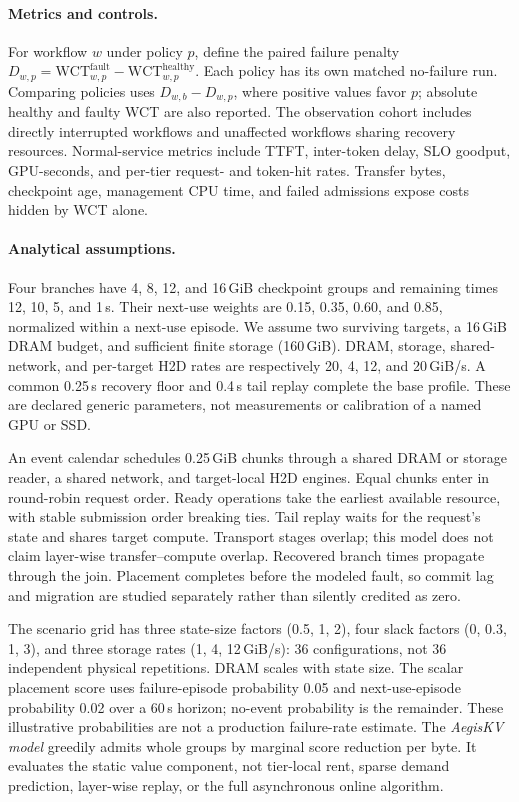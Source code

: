 \documentclass[sigplan,10pt,anonymous,nonacm]{acmart}
\begin{document}
\paragraph{Metrics and controls.}
For workflow $w$ under policy $p$, define the paired failure penalty
$D_{w,p}=\mathrm{WCT}^{\mathrm{fault}}_{w,p}-\mathrm{WCT}^{\mathrm{healthy}}_{w,p}$.
Each policy has its own matched no-failure run. Comparing policies uses
$D_{w,b}-D_{w,p}$, where positive values favor $p$; absolute healthy and
faulty WCT are also reported. The observation cohort includes directly
interrupted workflows and unaffected workflows sharing recovery resources.
Normal-service metrics include TTFT, inter-token delay, SLO goodput,
GPU-seconds, and per-tier request- and token-hit rates. Transfer bytes,
checkpoint age, management CPU time, and failed admissions expose costs
hidden by WCT alone.

\paragraph{Analytical assumptions.}
Four branches have 4, 8, 12, and 16\,GiB checkpoint groups and remaining
times 12, 10, 5, and 1\,s. Their next-use weights are 0.15, 0.35, 0.60,
and 0.85, normalized within a next-use episode. We assume two surviving
targets, a 16\,GiB DRAM budget, and sufficient finite storage (160\,GiB).
DRAM, storage, shared-network, and per-target H2D rates are respectively
20, 4, 12, and 20\,GiB/s. A common 0.25\,s recovery floor and 0.4\,s tail
replay complete the base profile. These are declared generic parameters,
not measurements or calibration of a named GPU or SSD.

An event calendar schedules 0.25\,GiB chunks through a shared DRAM or
storage reader, a shared network, and target-local H2D engines. Equal
chunks enter in round-robin request order. Ready operations take the
earliest available resource, with stable submission order breaking ties.
Tail replay waits for the request's state and shares target compute.
Transport stages overlap; this model does not claim layer-wise
transfer--compute overlap. Recovered branch times propagate through the
join. Placement completes before the modeled fault, so commit lag and
migration are studied separately rather than silently credited as zero.

The scenario grid has three state-size factors (0.5, 1, 2), four slack
factors (0, 0.3, 1, 3), and three storage rates (1, 4, 12\,GiB/s): 36
configurations, not 36 independent physical repetitions. DRAM scales with
state size. The scalar placement score uses failure-episode probability
0.05 and next-use-episode probability 0.02 over a 60\,s horizon; no-event
probability is the remainder. These illustrative probabilities are not a
production failure-rate estimate. The \emph{AegisKV model} greedily admits
whole groups by marginal score reduction per byte. It evaluates the
static value component, not tier-local rent, sparse demand prediction,
layer-wise replay, or the full asynchronous online algorithm.
\end{document}
